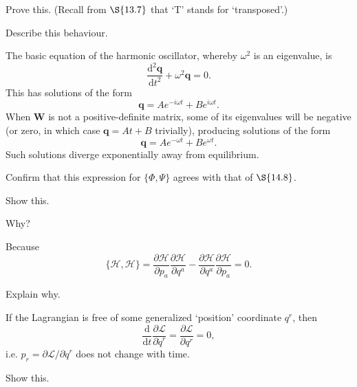 \documentclass[../road-to-reality.tex]{subfiles}
\begin{document}
\begin{questions}
\question Prove this. (Recall from $\S{13.7}$ that `T' stands for `transposed'.)

\question Describe this behaviour.

  \begin{solution}
    The basic equation of the harmonic oscillator, whereby $\omega^2$ is
    an eigenvalue, is
    \[
      \frac{\mathrm{d}^2\mathbf{q}}{\mathrm{d}t^2} + \omega^2\mathbf{q} = 0.
    \]
    This has solutions of the form
    \[
      \mathbf{q} = Ae^{-i\omega{t}} + Be^{i\omega{t}}.
    \]
    When $\mathbf{W}$ is not a positive-definite matrix, some of its eigenvalues
    will be negative (or zero, in which case $\mathbf{q}=At + B$ trivially),
    producing solutions of the form 
    \[
      \mathbf{q} = Ae^{-\omega{t}} + Be^{\omega{t}}.
    \]
    Such solutions diverge exponentially away from equilibrium.
  \end{solution}

\question Confirm that this expression for $\{\Phi,\Psi\}$ agrees with that of $\S{14.8}$.

\question Show this.

\question Why?

  \begin{solution}
    Because
    \[
      \{\mathcal{H},\mathcal{H}\} =
      \frac{\partial\mathcal{H}}{\partial{p_a}}\frac{\partial\mathcal{H}}{\partial{q^a}}
      -
      \frac{\partial\mathcal{H}}{\partial{q^a}}\frac{\partial\mathcal{H}}{\partial{p_a}}
      = 0.
    \]
  \end{solution}

\question Explain why.

  \begin{solution}
    If the Lagrangian is free of some generalized `position' coordinate $q^r$,
    then
    \[
      \frac{\mathrm{d}}{\mathrm{d}t}\frac{\partial\mathcal{L}}{\partial{\dot{q}^r}}
      = \frac{\partial\mathcal{L}}{\partial{q^r}} = 0,
    \]
    i.e. $p_r=\partial\mathcal{L}/\partial\dot{q}^r$ does not change with time.
  \end{solution}

\question Show this.


\end{questions}
\end{document}
